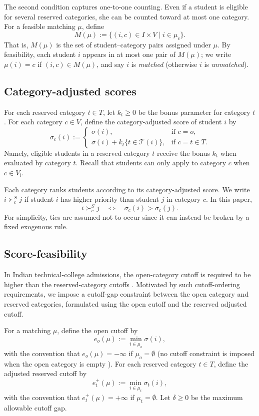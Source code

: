 \documentclass[10pt]{article}
\newcommand{\T}{\mathcal{T}}
\newcommand{\1}{\mathbf{1}}
\newcommand{\yao}[1]{{\color{blue}#1}}
\begin{document}
The second condition captures one-to-one counting. Even if a student is eligible for several reserved categories, she can be counted toward at most one category. For a feasible matching $\mu$, define
\[
M(\mu) := \{(i,c)\in I\times V \mid i\in \mu_c\}.
\]
That is, $M(\mu)$ is the set of student--category pairs assigned under $\mu$. By feasibility, each student $i$ appears in at most one pair of $M(\mu)$; we write $\mu(i)=c$ if $(i,c)\in M(\mu)$, and say $i$ is \emph{matched} (otherwise $i$ is \emph{unmatched}).

\subsection{Category-adjusted scores}
For each reserved category $t\in T$, let $k_t\ge 0$ be the bonus parameter for category $t$. For each category $c\in V$, define the category-adjusted score of student $i$ by
\[
\sigma_c(i)
:=
\begin{cases}
\sigma(i), & \text{if } c=o,\\[3pt]
\sigma(i)+k_t\{t\in\T(i)\}, & \text{if } c=t\in T.
\end{cases}
\]
Namely, eligible students in a reserved category $t$ receive the bonus $k_t$ when evaluated by category $t$. Recall that students can only apply to category $c$ when $c\in V_i$.

Each category ranks students according to its category-adjusted score. We write $i\succ_c^S j$ if student $i$ has higher priority than student $j$ in category $c$. In this paper,
\[
i\succ_c^S j
\quad \Longleftrightarrow \quad
\sigma_c(i)>\sigma_c(j).
\]
For simplicity, ties are assumed not to occur since it can instead be broken by a fixed exogenous rule.

\subsection{Score-feasibility}

In Indian technical-college admissions, the open-category cutoff is required to be higher than the reserved-category cutoffs \citep{AyTu23a}. Motivated by such cutoff-ordering requirements, we impose a cutoff-gap constraint between the open category and reserved categories, formulated using the open cutoff and the reserved adjusted cutoff.

For a matching $\mu$, define the open cutoff by
\[
e_o(\mu):=\min_{i\in\mu_o}\sigma(i),
\]
with the convention that $e_o(\mu)=-\infty$ if $\mu_o=\emptyset$ (no cutoff constraint is imposed when the open category is empty 
). For each reserved category $t\in T$, define the adjusted reserved cutoff by
\[
e_t^+(\mu):=\min_{i\in\mu_t}\sigma_t(i),
\]
with the convention that $e_t^+(\mu)=+\infty$ if $\mu_t=\emptyset$. Let $\delta\ge 0$ be the maximum allowable cutoff gap.
\end{document}
